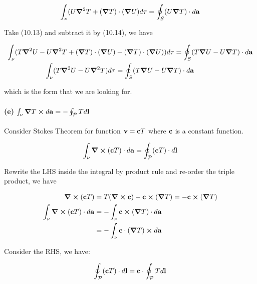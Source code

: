 \documentclass{article}
\numberwithin{equation}{section}
\begin{document}
\begin{equation}
    \int_\nu ( U \grad^2 T + (\grad T) \cdot (\grad U) d \tau = \oint_S (U \grad T) \cdot d \vb{a}
\end{equation}

Take (10.13) and subtract it by (10.14), we have

\begin{equation}
\begin{split}
    \int_\nu (T \grad^2 U - U \grad^2 T + (\grad T) \cdot (\grad U) &-  (\grad T) \cdot (\grad U) ) d \tau = \oint_S (T \grad U  - U \grad T )\cdot d \vb{a} \\
    \int_{\nu} (T \grad^2 U - U \grad^2 T) d \tau &= \oint_S (T \grad U  - U \grad T )\cdot d \vb{a}
\end{split}
\end{equation}

which is the form that we are looking for. 

\paragraph{(e) $\int_\nu \grad T \cross d \vb{a} = - \oint_{\mathcal{P}} T d \vb{l}$ \\}

Consider Stokes Theorem for function $\vb{v = c}T$ where $\vb{c}$ is a constant function.

\begin{equation}
    \int_\nu \curl (\vb{c} T) \cdot d \vb{a} = \oint_\mathcal{P} (\vb{c} T) \cdot d \vb{l}
\end{equation}

Rewrite the LHS inside the integral by product rule and re-order the triple product, we have

\begin{equation}
    \begin{split}
        \curl (\vb{c} T) &= T (\curl \vb{c}) - \vb{c} \cross (\grad T) =  - \vb{c} \cross (\grad T) \\
        \int_\nu \curl (\vb{c} T) \cdot d \vb{a} &= - \int_\nu \vb{c} \cross (\grad T) \cdot d \vb{a}  \\ &= - \int_\nu \vb{c} \cdot (\grad T)  \cross d \vb{a}
    \end{split}
\end{equation}

Consider the RHS, we have:

\begin{equation}
    \oint_\mathcal{P} (\vb{c} T) \cdot d \vb{l} = \vb{c} \cdot \oint_\mathcal{P} T d \vb{l}
\end{equation}
\end{document}
